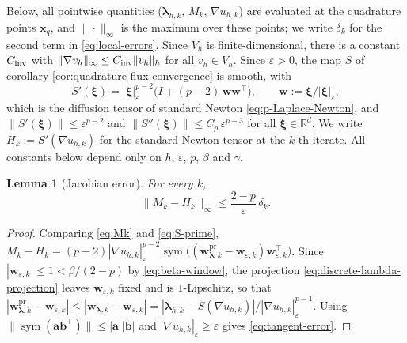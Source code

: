 \documentclass[11pt,pdflatex,sn-mathphys-num]{sn-jnl}
\theoremstyle{thmstyleone}%
\newtheorem{lemma}[theorem]{Lemma}%
\theoremstyle{thmstyletwo}%
\theoremstyle{thmstylethree}%
\newcommand{\bs}[1]{\ensuremath{\boldsymbol{#1}}}
\DeclareMathOperator{\sym}{sym}
\begin{document}
Below, all pointwise quantities ($\bs\lambda_{h,k}$, $M_k$, $\nabla u_{h,k}$) are evaluated at the quadrature points $\bs x_q$, and $\|\cdot\|_\infty$ is the maximum over these points; we write $\delta_k$ for the second term in \eqref{eq:local-errors}. Since $V_h$ is finite-dimensional, there is a constant $C_{\rm inv}$ with $\|\nabla v_h\|_\infty\le C_{\rm inv}\|v_h\|_h$ for all $v_h\in V_h$. Since $\varepsilon>0$, the map $S$ of corollary \ref{cor:quadrature-flux-convergence} is smooth, with
\begin{equation}\label{eq:S-prime}
  S'(\bs\xi)=|\bs\xi|_\varepsilon^{p-2}\bigl(I+(p-2)\,\bs w\bs w^\top\bigr),\qquad \bs w:=\bs\xi/|\bs\xi|_\varepsilon,
\end{equation}
which is the diffusion tensor of standard Newton \eqref{eq:p-Laplace-Newton}, and $\|S'(\bs\xi)\|\le\varepsilon^{p-2}$ and $\|S''(\bs\xi)\|\le C_p\,\varepsilon^{p-3}$ for all $\bs\xi\in\mathbb R^d$. We write $H_k:=S'(\nabla u_{h,k})$ for the standard Newton tensor at the $k$-th iterate. All constants below depend only on $h$, $\varepsilon$, $p$, $\beta$ and $\gamma$.

\begin{lemma}[Jacobian error]\label{lem:tangent-error}
For every $k$,
\begin{equation}\label{eq:tangent-error}
  \|M_k-H_k\|_\infty\le\frac{2-p}{\varepsilon}\,\delta_k .
\end{equation}
\end{lemma}
\begin{proof}
Comparing \eqref{eq:Mk} and \eqref{eq:S-prime},
$M_k-H_k=(p-2)|\nabla u_{h,k}|_\varepsilon^{p-2}\sym\bigl((\bs w_{\bs\lambda,k}^{\mathrm{pr}}-\bs w_{\varepsilon,k})\bs w_{\varepsilon,k}^\top\bigr)$.
Since $|\bs w_{\varepsilon,k}|\le1<\beta/(2-p)$ by \eqref{eq:beta-window}, the projection \eqref{eq:discrete-lambda-projection} leaves $\bs w_{\varepsilon,k}$ fixed and is $1$-Lipschitz, so that
$|\bs w_{\bs\lambda,k}^{\mathrm{pr}}-\bs w_{\varepsilon,k}|\le|\bs w_{\bs\lambda,k}-\bs w_{\varepsilon,k}|=|\bs\lambda_{h,k}-S(\nabla u_{h,k})|/|\nabla u_{h,k}|_\varepsilon^{p-1}$. Using $\|\sym(\bs a\bs b^\top)\|\le|\bs a||\bs b|$ and $|\nabla u_{h,k}|_\varepsilon\ge\varepsilon$ gives \eqref{eq:tangent-error}.
\end{proof}
\end{document}
